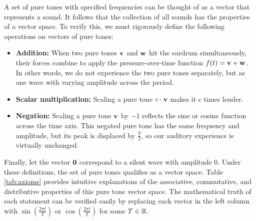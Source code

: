 \par \indentt A set of pure tones with specified frequencies can be thought of as a vector that represents a sound. It follows that the collection of all sounds has the properties of a vector space. To verify this, we must rigorously define the following operations on vectors of pure tones:

\begin{itemize}
    \item \textbf{Addition:} When two pure tones $\mathbf{v}$ and $\mathbf{w}$ hit the eardrum simultaneously, their forces combine to apply the pressure-over-time function $f(t) = \mathbf{v}+\mathbf{w}$. In other words, we do not experience the two pure tones separately, but as one wave with varying amplitude across the period.
    \item \textbf{Scalar multiplication:} Scaling a pure tone $c\cdot\mathbf{v}$ makes it $c$ times louder.
    \item \textbf{Negation:} Scaling a pure tone $\mathbf{v}$ by $-1$ reflects the sine or cosine function across the time axis. This negated pure tone has the same frequency and amplitude, but its peak is displaced by $\frac{T}{2}$, so our auditory experience is virtually unchanged.
\end{itemize}

\par Finally, let the vector $\mathbf{0}$ correspond to a silent wave with amplitude $0$. Under these definitions, the set of pure tones qualifies as a vector space. Table \ref{tab:axioms} provides intuitive explanations of the associative, commutative, and distributive properties of this pure tone vector space. The mathematical truth of each statement can be verified easily by replacing each vector in the left column with $\sin(\frac{2\pi t}{T})$ or $\cos(\frac{2\pi t}{T})$ for some $T\in\mathbb{R}$.


